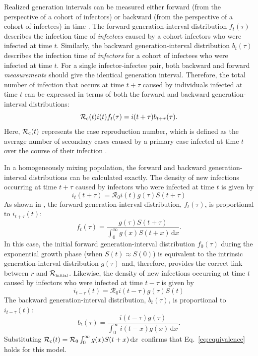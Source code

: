 \documentclass[12pt]{article}
\newcommand{\eref}[1]{Eq.~\ref{eq:#1}}
\newcommand{\Rx}[1]{\ensuremath{{\mathcal R}_{#1}}\xspace}
\newcommand{\RR}{\ensuremath{{\mathcal R}}}
\newcommand{\Rini}{\Rx{\textrm{\tiny initial}}}
\begin{document}
Realized generation intervals can be measured either forward (from the perspective of a cohort of infectors) or backward (from the perspective of a cohort of infectees) in time \citep{champredon2015intrinsic, britton2019estimation}.
The forward generation-interval distribution $f_t(\tau)$ describes the infection time of \emph{infectees} caused by a cohort infectors who were infected at time $t$.
Similarly, the backward generation-interval distribution $b_t(\tau)$ describes the infection time of \emph{infectors} for a cohort of infectees who were infected at time $t$.
For a single infector-infectee pair, both backward and forward \emph{measurements} should give the identical generation interval.
Therefore, the total number of infection that occurs at time $t + \tau$ caused by individuals infected at time $t$ can be expressed in terms of both the forward and backward generation-interval distributions:
\begin{equation}
\mathcal R_{\rm c}(t) i(t) f_t(\tau) = i(t+\tau) b_{t+\tau}(\tau).
\label{eq:equivalence}
\end{equation}
Here, $\mathcal R_{\rm c}(t)$ represents the case reproduction number, which is defined as the average number of secondary cases caused by a primary case infected at time $t$ over the course of their infection \citep{fraser2007estimating}.

In a homogeneously mixing population, the forward and backward generation-interval distributions can be calculated exactly.
The density of new infections occurring at time $t+\tau$ caused by infectors who were infected at time $t$ is given by
\begin{equation}
i_{t}(t+\tau) = \RR_0 i(t) g(\tau) S(t+\tau)
\end{equation}
As shown in \cite{champredon2015intrinsic}, the forward generation-interval distribution, $f_t(\tau)$, is proportional to $i_{t+\tau}(t)$:
\begin{equation}
f_t(\tau) = \frac{g(\tau) S(t+\tau)}{\int_0^\infty g(x) S(t+x) \,\mathrm{d}x}.
\label{eq:forward}
\end{equation}
In this case, the initial forward generation-interval distribution $f_0(\tau)$ during the exponential growth phase (when $S(t) \approx S(0)$) is equivalent to the intrinsic generation-interval distribution $g(\tau)$ and, therefore, provides the correct link between $r$ and \Rini.
Likewise, the density of new infections occurring at time $t$ caused by infectors who were infected at time $t-\tau$ is given by
\begin{equation}
i_{t-\tau}(t) = \RR_0 i(t-\tau) g(\tau) S(t)
\end{equation}
The backward generation-interval distribution, $b_t(\tau)$, is proportional to $i_{t-\tau}(t)$:
\begin{equation}
b_t(\tau) = \frac{i(t-\tau) g(\tau)}{\int_0^\infty i(t-x) g(x)\,\mathrm{d}x}.
\end{equation}
Substituting $\mathcal R_{\rm c}(t) = \mathcal R_0 \int_0^\infty g(x) S(t+x) \,\mathrm{d}x$ confirms that \eref{equivalence} holds for this model.
\end{document}

